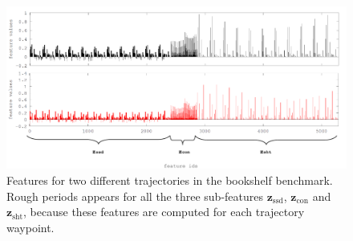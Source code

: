\documentclass[letterpaper, 10 pt, conference]{ieeeconf}  %
\newcommand{\fssd}{\mbox{$\mathbf z_{\text{ssd}}$}}
\newcommand{\fcon}{\mbox{$\mathbf z_{\text{con}}$}}
\newcommand{\fsht}{\mbox{$\mathbf z_{\text{sht}}$}}
\begin{document}
\begin{figure}[t]
\centering
\includegraphics[width=\linewidth]{figure/features.pdf}
\caption{Features for two different trajectories in the bookshelf benchmark. Rough periods appears for all the three sub-features $\fssd$, $\fcon$ and $\fsht$, because these features are computed for each trajectory waypoint.}
\label{fig:features}
\end{figure}
\end{document}
